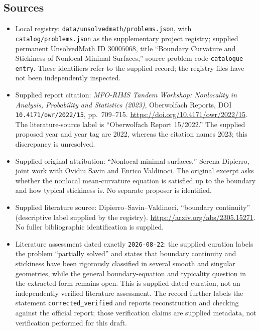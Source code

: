 \documentclass[11pt]{article}
\begin{document}
\subsection{Sources}
\begin{itemize}
\item Local registry: \texttt{data/unsolvedmath/problems.json}, with \texttt{catalog/problems.json} as the supplementary project registry; supplied permanent UnsolvedMath ID \(30005068\), title ``Boundary Curvature and Stickiness of Nonlocal Minimal Surfaces,'' source problem code \texttt{catalogue entry}. These identifiers refer to the supplied record; the registry files have not been independently inspected.
\item Supplied report citation: \emph{MFO-RIMS Tandem Workshop: Nonlocality in Analysis, Probability and Statistics (2023)}, Oberwolfach Reports, DOI \texttt{10.4171/owr/2022/15}, pp.\ 709--715. \url{https://doi.org/10.4171/owr/2022/15}. The literature-source label is ``Oberwolfach Report 15/2022.'' The supplied proposed year and year tag are 2022, whereas the citation names 2023; this discrepancy is unresolved.
\item Supplied original attribution: ``Nonlocal minimal surfaces,'' Serena Dipierro, joint work with Ovidiu Savin and Enrico Valdinoci. The original excerpt asks whether the nonlocal mean-curvature equation is satisfied up to the boundary and how typical stickiness is. No separate proposer is identified.
\item Supplied literature source: Dipierro--Savin--Valdinoci, ``boundary continuity'' (descriptive label supplied by the registry). \url{https://arxiv.org/abs/2305.15271}. No fuller bibliographic identification is supplied.
\item Literature assessment dated exactly \texttt{2026-08-22}: the supplied curation labels the problem ``partially solved'' and states that boundary continuity and stickiness have been rigorously classified in several smooth and singular geometries, while the general boundary-equation and typicality question in the extracted form remains open. This is supplied dated curation, not an independently verified literature assessment. The record further labels the statement \texttt{corrected\_verified} and reports reconstruction and checking against the official report; those verification claims are supplied metadata, not verification performed for this draft.
\end{itemize}
\end{document}
